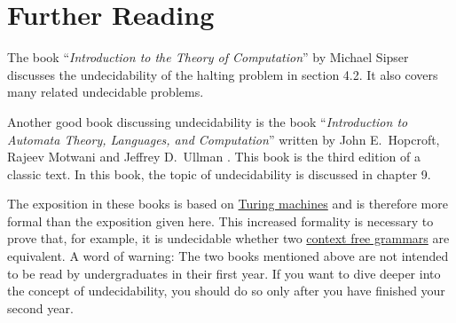\section{Further Reading}
The book ``\emph{Introduction to the Theory of Computation}'' by Michael Sipser \cite{sipser:1996}
discusses the undecidability of the halting problem in section 4.2.
It also covers many related
undecidable problems.

Another good book discussing undecidability is the book 
``\emph{Introduction to Automata Theory, Languages, and Computation}'' written by John E.~Hopcroft,
Rajeev Motwani and Jeffrey D.~Ullman \cite{hopcroft:06}.
This book is the third edition of a
classic text.  In this book, the topic of undecidability is discussed in chapter 9.

The exposition in these books is based on
\href{https://en.wikipedia.org/wiki/Turing_machine}{Turing machines} and is therefore more formal than the
exposition given here.
This increased formality is necessary to prove that, for example, it is undecidable
whether two \href{https://en.wikipedia.org/wiki/Context-free_grammar}{context free grammars} are equivalent.
A word of warning: The two books mentioned above are not intended to be read by undergraduates in their first
year.
If you want to dive deeper into the concept of undecidability, you should do so only after you have
finished your second year.

